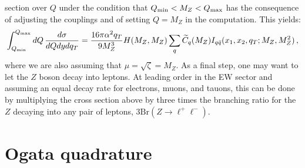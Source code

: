 \documentclass[10pt,a4paper]{article}
\begin{document}
section over $Q$ under the condition that
$Q_{\rm min}<M_Z<Q_{\rm max}$ has the consequence of adjusting the
couplings and of setting $Q=M_Z$ in the computation. This yields:
\begin{equation}
\int_{Q_{\rm min}}^{Q_{\rm max}}dQ\,\frac{d\sigma}{dQ dy dq_T} =
 \frac{16\pi\alpha^2q_T}{9 M_Z^3} H(M_Z,M_Z) \sum_q \widetilde{C}_q(M_Z)
  I_{q\bar{q}}(x_1,x_2,q_T;M_Z,M_Z^2)\,,
\end{equation}
where we are also assuming that $\mu=\sqrt{\zeta}=M_Z$. As a final
step, one may want to let the $Z$ boson decay into leptons. At leading
order in the EW sector and assuming an equal decay rate for electrons,
muons, and tauons, this can be done by multiplying the cross section
above by three times the branching ratio for the $Z$ decaying into any
pair of leptons, $3\mbox{Br}(Z\rightarrow \ell^+\ell^-)$.


\newpage
\appendix

\section{Ogata quadrature}\label{app:OgataQuadrature}
\end{document}
